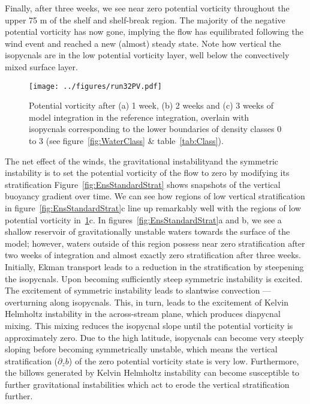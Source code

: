 Finally, after three weeks, we see near zero potential vorticity throughout the upper 75 m of the shelf and shelf-break region. The majority of the negative potential vorticity has now gone, implying the flow has equilibrated following the wind event and reached a new (almost) steady state. Note how vertical the isopycnals are in the low potential vorticity layer, well below the convectively mixed surface layer.

\begin{figure}[t]
    \centering
    \texttt{[image: ../figures/run32PV.pdf]}
    \caption{Potential vorticity after (a) 1 week, (b) 2 weeks and (c) 3 weeks of model integration in the reference integration, overlain with isopycnals corresponding to the lower boundaries of density classes 0 to 3 (see figure~\ref{fig:WaterClass} \& table~\ref{tab:Class}).}
    \label{fig:EnsStandardPV}
\end{figure}

The net effect of the winds, the gravitational instability\footnotemark and the symmetric instability is to set the potential vorticity of the flow to zero by modifying its stratification
Figure~\ref{fig:EnsStandardStrat} shows snapshots of the vertical buoyancy gradient over time. We can see how regions of low vertical stratification in figure~\ref{fig:EnsStandardStrat}c line up remarkably well with the regions of low potential vorticity in~\ref{fig:EnsStandardPV}c. In figures~\ref{fig:EnsStandardStrat}a and b, we see a shallow reservoir of gravitationally unstable waters towards the surface of the model; however, waters outside of this region possess near zero stratification after two weeks of integration and almost exactly zero stratification after three weeks. Initially, Ekman transport leads to a reduction in the stratification by steepening the isopycnals. Upon becoming sufficiently steep symmetric instability is excited. The excitement of symmetric instability leads to slantwise convection --- overturning along isopycnals. This, in turn, leads to the excitement of Kelvin Helmholtz instability in the across-stream plane, which produces diapycnal mixing. This mixing reduces the isopycnal slope until the potential vorticity is approximately zero. Due to the high latitude, isopycnals can become very steeply sloping before becoming symmetrically unstable\footnotemark, which means the vertical stratification ($\partial_z b$) of the zero potential vorticity state is very low. Furthermore, the billows generated by Kelvin Helmholtz instability can become susceptible to further gravitational instabilities which act to erode the vertical stratification further.


